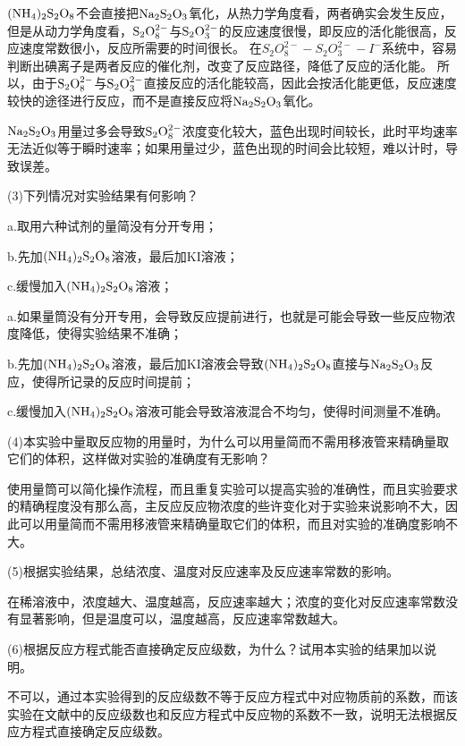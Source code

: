 \documentclass[a4paper,12pt]{article}
\begin{document}
$\rm (NH_4)_2S_2O_8$不会直接把$\rm Na_2S_2O_3$氧化，从热力学角度看，两者确实会发生反应，
但是从动力学角度看，$\rm S_2O_8^{2-}$与$\rm S_2O_3^{2-}$的反应速度很慢，即反应的活化能很高，反应速度常数很小，反应所需要的时间很长。
在$S_2O_8^{2-}-S_2O_3^{2-}-I^-$系统中，容易判断出碘离子是两者反应的催化剂，改变了反应路径，降低了反应的活化能。
所以，由于$\rm S_2O_8^{2-}$与$\rm S_2O_3^{2-}$直接反应的活化能较高，因此会按活化能更低，反应速度较快的途径进行反应，而不是直接反应将$\rm Na_2S_2O_3$氧化\textsuperscript{\cite{BSSZ200302005}}。

$\rm Na_2S_2O_3$用量过多会导致$\rm S_2O_8^{2-}$浓度变化较大，蓝色出现时间较长，此时平均速率无法近似等于瞬时速率；如果用量过少，蓝色出现的时间会比较短，难以计时，导致误差。

(3)下列情况对实验结果有何影响？

a.取用六种试剂的量简没有分开专用；

b.先加$\rm (NH_4)_2S_2O_8$溶液，最后加KI溶液；

c.缓慢加入$\rm (NH_4)_2S_2O_8$溶液；

a.如果量筒没有分开专用，会导致反应提前进行，也就是可能会导致一些反应物浓度降低，使得实验结果不准确；

b.先加$\rm (NH_4)_2S_2O_8$溶液，最后加KI溶液会导致$\rm (NH_4)_2S_2O_8$直接与$\rm Na_2S_2O_3$反应，使得所记录的反应时间提前；

c.缓慢加入$\rm (NH_4)_2S_2O_8$溶液可能会导致溶液混合不均匀，使得时间测量不准确。


(4)本实验中量取反应物的用量时，为什么可以用量简而不需用移液管来精确量取它们的体积，这样做对实验的准确度有无影响？

使用量筒可以简化操作流程，而且重复实验可以提高实验的准确性，而且实验要求的精确程度没有那么高，主反应反应物浓度的些许变化对于实验来说影响不大，因此可以用量简而不需用移液管来精确量取它们的体积，而且对实验的准确度影响不大。

(5)根据实验结果，总结浓度、温度对反应速率及反应速率常数的影响。

在稀溶液中，浓度越大、温度越高，反应速率越大；浓度的变化对反应速率常数没有显著影响，但是温度可以，温度越高，反应速率常数越大。

(6)根据反应方程式能否直接确定反应级数，为什么？试用本实验的结果加以说明。

不可以，通过本实验得到的反应级数不等于反应方程式中对应物质前的系数，而该实验在文献中的反应级数\textsuperscript{\cite{FYSZ198802003}}也和反应方程式中反应物的系数不一致，说明无法根据反应方程式直接确定反应级数。



\end{document}
